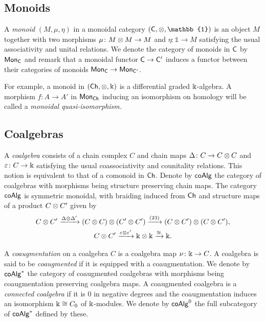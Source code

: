 \subsection{Monoids}

A \textit{monoid} $(M, \mu, \eta)$ in a monoidal category $(\sC, \ot, \mathbb{1})$ is an object $M$ together with two morphisms $\mu \colon M \otimes M \to M$ and $\eta \colon \mathbb{1} \to M$ satisfying the usual associativity and unital relations.
We denote the category of monoids in $\mathsf{C}$ by $\mathsf{Mon}_{\mathsf{C}}$ and remark that a monoidal functor $\mathsf{C} \to \mathsf{C}^\prime$ induces a functor between their categories of monoids $\mathsf{Mon}_{\mathsf{C}} \to \mathsf{Mon}_{\mathsf{C}^\prime}$.

For example, a monoid in $(\mathsf{Ch}, \otimes, \Bbbk)$ is a differential graded $\Bbbk$-algebra. A morphism $f: A \to A'$ in $\mathsf{Mon}_{\mathsf{Ch}}$ inducing an isomorphism on homology will be called a \textit{monoidal quasi-isomorphism.}

\subsection{Coalgebras}\label{ss:coalgebras}

A \textit{coalgebra} consists of a chain complex $C$ and chain maps $\Delta \colon C \to C \otimes C$ and $\varepsilon \colon C \to \Bbbk$ satisfying the usual coassociativity and counitality relations.
This notion is equivalent to that of a comonoid in $\mathsf{Ch}$.
Denote by $\mathsf{coAlg}$ the category of coalgebras with morphisms being structure preserving chain maps.
The category $\mathsf{coAlg}$ is symmetric monoidal, with braiding induced from $\mathsf{Ch}$ and structure maps of a product $C \otimes C^\prime$ given by
\begin{gather*}
	C \otimes C^\prime \xrightarrow{\Delta \otimes \Delta^\prime}
	(C \otimes C) \otimes (C^\prime \otimes C^\prime) \xrightarrow{(23)}
	(C \otimes C^\prime) \otimes (C \otimes C^\prime), \\
	C \otimes C^\prime \xrightarrow{\varepsilon \otimes \varepsilon^\prime}
	\Bbbk \otimes \Bbbk \xrightarrow{\cong} \Bbbk.
\end{gather*}

A \textit{coaugmentation} on a coalgebra $C$ is a coalgebra map $\nu \colon \Bbbk \to C$.
A coalgebra is said to be \textit{coaugmented} if it is equipped with a coaugmentation.
We denote by $\mathsf{coAlg}^\ast$ the category of coaugmented coalgebras with morphisms being coaugmentation preserving coalgebra maps.
A coaugmented coalgebra is a \textit{connected coalgebra} if it is $0$ in negative degrees and the coaugmentation induces an isomorphism $\Bbbk \cong C_0$ of $\Bbbk$-modules.
We denote by $\mathsf{coAlg}^0$ the full subcategory of $\mathsf{coAlg}^\ast$ defined by these.

